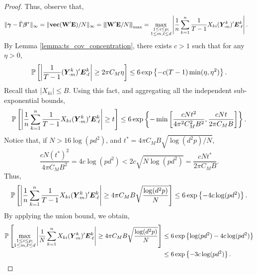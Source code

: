 \begin{proof}
    Thus, observe that,
    \begin{align*}
        \| \bm{\gamma} - \hat\Gamma \bm{\beta}^* \|_\infty &= \|\textbf{vec}(\mathbf{W}'\mathbf{E})/N\|_\infty = {\left\vert\kern-0.25ex\left\vert\kern-0.25ex\left\vert  \mathbf{W}'\mathbf{E}/N  \right\vert\kern-0.25ex\right\vert\kern-0.25ex\right\vert}_{\max} = \max_{\substack{1\leq i\leq p;\\ 1\leq m,\ell\leq d }} \left|  \frac{1}{n} \sum_{k=1}^n \frac{1}{T-1} X_{ki} (\bm{Y}^{k}_{\cdot m})' \bm{E}^{k}_{\cdot \ell} \right|.
    \end{align*}
    By Lemma \ref{lemma:ts_cov_concentration}, there exists $c> 1$ such that for any $\eta > 0$,
    \begin{equation*}
        \mathbb{P}\left[  \left|\frac{1}{T-1}  (\bm{Y}^{k}_{\cdot m})' \bm{E}^{k}_{\cdot \ell} \right|  \geq 2\pi C_M \eta \right] \leq 6 \exp\left\{  - c (T-1) \min(\eta,\eta^2) \right\}.
    \end{equation*}
    Recall that $|X_{ki}| \leq B$. Using this fact, and aggregating all the independent sub-exponential bounds, 
    \begin{equation*}
        \mathbb{P}\left[  \left|\frac{1}{n} \sum_{k=1}^n \frac{1}{T-1} X_{ki} (\bm{Y}^{k}_{\cdot m})' \bm{E}^{k}_{\cdot \ell}  \right|  \geq t \right] \leq 6 \exp\left\{ -\min\left[  \frac{cNt^2}{4\pi^2 C_M^2 B^2}, \frac{cNt}{2\pi C_M B} \right] \right\}.
    \end{equation*}
    Notice that, if $N > 16\log(pd^2) $, and $t^* = 4\pi C_M B \sqrt{\log(d^2p)/N}$, 
    $$ \frac{cN(t^*)^2}{4\pi C_M B^2 } = 4c\log(pd^2) < 2c\sqrt{N \log(pd^2) }  = \frac{cNt^*}{2\pi C_M B}. $$
    Thus, 
    \begin{equation*}
        \mathbb{P}\left[  \left|\frac{1}{n} \sum_{k=1}^n \frac{1}{T-1} X_{ki} (\bm{Y}^{k}_{\cdot m})' \bm{E}^{k}_{\cdot \ell}  \right|  \geq   4\pi C_M B \sqrt{\frac{\log(d^2p)}{N}}  \right] \leq 6 \exp\left\{ -4c\log(pd^2) \right\}.
    \end{equation*}
    By applying the union bound, we obtain,
    \begin{align*}
        \mathbb{P}\left[  \max_{\substack{1\leq i\leq p;\\ 1\leq m,\ell\leq d }} \left|\frac{1}{N} \sum_{k=1}^n  X_{ki} (\bm{Y}^{k}_{\cdot m})' \bm{E}^{k}_{\cdot \ell}  \right|  \geq   4\pi C_M B \sqrt{\frac{\log(d^2p)}{N}}  \right] &\leq 6 \exp\left\{ \log(pd^2) -4c\log(pd^2) \right\} \\
        &\leq  6 \exp\left\{ -3c\log(pd^2) \right\} .
    \end{align*}
\end{proof}


